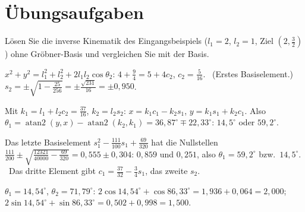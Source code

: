 \section{Übungsaufgaben}

\begin{aufgabe}
Lösen Sie die inverse Kinematik des Eingangsbeispiels ($l_1 = 2$, $l_2 = 1$, Ziel $(2, \tfrac32)$) ohne Gröbner-Basis und vergleichen Sie mit der Basis.

\loesung
{}
$x^{2} + y^{2} = l_1^{2} + l_2^{2} + 2l_1l_2\cos\theta_2$: $4 + \tfrac94 = 5 + 4c_2$, $c_2 = \tfrac{5}{16}$. \checkmark\ (Erstes Basiselement.) $s_2 = \pm\sqrt{1 - \tfrac{25}{256}} = \pm\tfrac{\sqrt{231}}{16} = \pm0{,}950$.

Mit $k_1 = l_1 + l_2c_2 = \tfrac{37}{16}$, $k_2 = l_2s_2$: $x = k_1c_1 - k_2s_1$, $y = k_1s_1 + k_2c_1$. Also $\theta_1 = \operatorname{atan2}(y, x) - \operatorname{atan2}(k_2, k_1) = 36{,}87^{\circ}\mp22{,}33^{\circ}$: $14{,}5^{\circ}$ oder $59{,}2^{\circ}$. \checkmark

Das letzte Basiselement $s_1^{2} - \tfrac{111}{100}s_1 + \tfrac{69}{320}$ hat die Nullstellen $\tfrac{111}{200}\pm\sqrt{\tfrac{12321}{40000} - \tfrac{69}{320}} = 0{,}555\pm0{,}304$: $0{,}859$ und $0{,}251$, also $\theta_1 = 59{,}2^{\circ}$ bzw.\ $14{,}5^{\circ}$. \checkmark\ Das dritte Element gibt $c_1 = \tfrac{37}{32} - \tfrac34s_1$, das zweite $s_2$.

$\theta_1 = 14{,}54^{\circ}$, $\theta_2 = 71{,}79^{\circ}$: $2\cos14{,}54^{\circ} + \cos86{,}33^{\circ} = 1{,}936 + 0{,}064 = 2{,}000$; $2\sin14{,}54^{\circ} + \sin86{,}33^{\circ} = 0{,}502 + 0{,}998 = 1{,}500$. \checkmark

\begin{center}
\begin{minipage}{0.88\textwidth}
\end{minipage}
\end{center}
\end{aufgabe}

